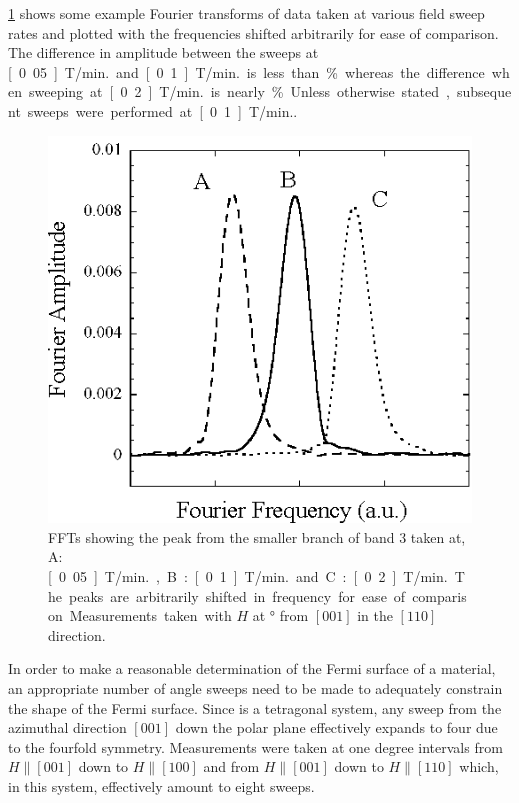  \Fig\ref{Fig:ResD:ComparisonSweepRates} shows some example Fourier transforms of data taken at various field sweep rates and plotted with the frequencies shifted arbitrarily for ease of comparison. The difference in amplitude between the sweeps at \unit[0.05]{T/min.} and \unit[0.1]{T/min.} is less than \unit[1]{\%} whereas the difference when sweeping at \unit[0.2]{T/min.} is nearly \unit[5]{\%}. Unless otherwise stated, subsequent sweeps were performed at \unit[0.1]{T/min.}.
\begin{figure}[htbp]
    \begin{center}
        \includegraphics[scale=0.7]{Chapter-dHvABaFe2P2/Figures/AngleDepMeasurements/SweepRateComparison/SweepRateComparison}
        \caption{FFTs showing the peak from the smaller branch of band $3$ taken at, A: \unit[0.05]{T/min.}, B: \unit[0.1]{T/min.} and C: \unit[0.2]{T/min.}. The peaks are arbitrarily shifted in frequency for ease of comparison. Measurements taken with $H$ at \unit[10]{\degree} from $[001]$ in the $[110]$ direction.}
        \label{Fig:ResD:ComparisonSweepRates}
    \end{center}
\end{figure}

In order to make a reasonable determination of the Fermi surface of a material, an appropriate number of angle sweeps need to be made to adequately constrain the shape of the Fermi surface. Since \BaFeP is a tetragonal system, any sweep from the azimuthal direction $[001]$ down the polar plane effectively expands to four due to the fourfold symmetry. Measurements were taken at one degree intervals from $H\parallel[001]$ down to $H\parallel[100]$ and from $H\parallel[001]$ down to $H\parallel[110]$ which, in this system, effectively amount to eight sweeps.

